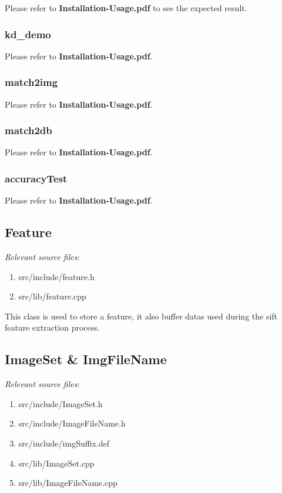 \documentclass[paper=a4, fontsize=11pt]{scrartcl} %
\numberwithin{equation}{section} %
\numberwithin{figure}{section} %
\numberwithin{table}{section} %
\begin{document}
Please refer to \textbf{Installation-Usage.pdf} to see the expected result.

\subsubsection{kd\_demo}

Please refer to \textbf{Installation-Usage.pdf}.

\subsubsection{match2img}

Please refer to \textbf{Installation-Usage.pdf}.

\subsubsection{match2db}

Please refer to \textbf{Installation-Usage.pdf}.

\subsubsection{accuracyTest}

Please refer to \textbf{Installation-Usage.pdf}.

\subsection{Feature}

\textsl{Relevant source files}: 

\begin{enumerate}
    \item src/include/feature.h
    \item src/lib/feature.cpp
\end{enumerate}

This class is used to store a feature, it also buffer datas used during the sift feature extraction process.\\

\subsection{ImageSet \& ImgFileName}

\textsl{Relevant source files}: 

\begin{enumerate}
    \item src/include/ImageSet.h
    \item src/include/ImageFileName.h
    \item src/include/imgSuffix.def
    \item src/lib/ImageSet.cpp
    \item src/lib/ImageFileName.cpp
\end{enumerate}
\end{document}

